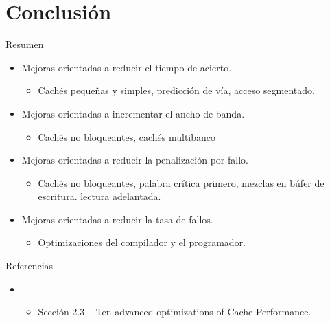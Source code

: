 \section{Conclusión}

\begin{frame}[t]{Resumen}
\begin{itemize}
  \item Mejoras orientadas a reducir el tiempo de acierto.
    \begin{itemize}
      \item Cachés pequeñas y simples, predicción de vía, acceso segmentado.
    \end{itemize}

  \item Mejoras orientadas a incrementar el ancho de banda.
    \begin{itemize}
      \item Cachés no bloqueantes, cachés multibanco
    \end{itemize}

  \item Mejoras orientadas a reducir la penalización por fallo.
    \begin{itemize}
      \item Cachés no bloqueantes, palabra crítica primero, mezclas en búfer de escritura.
            lectura adelantada.
    \end{itemize}

  \item Mejoras orientadas a reducir la tasa de fallos.
    \begin{itemize}
      \item Optimizaciones del compilador y el programador.
    \end{itemize}
\end{itemize}
\end{frame}


\begin{frame}[t]{Referencias}
\begin{itemize}
  \item \bibhennessy
    \begin{itemize}
       \item Sección 2.3 -- Ten advanced optimizations of Cache Performance.
    \end{itemize}
\end{itemize}
\end{frame}
